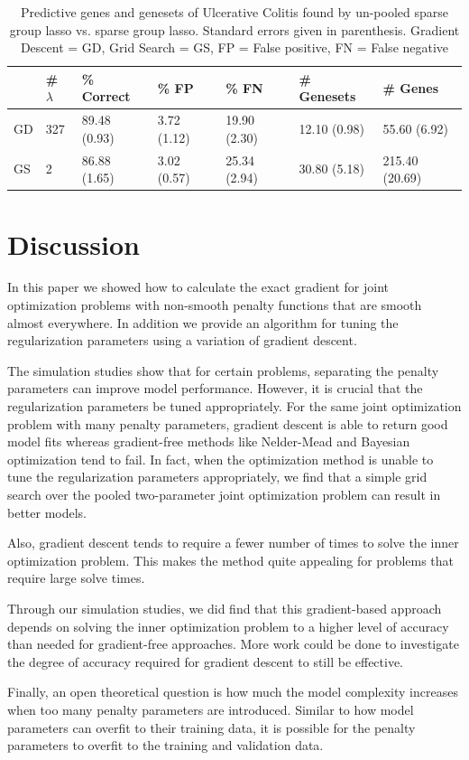 \documentclass[12pt]{article}
\begin{document}
\begin{table}
\caption{\label{colitis} Predictive genes and genesets of Ulcerative Colitis found by un-pooled sparse group lasso vs. sparse group lasso. Standard errors given in parenthesis. Gradient Descent = GD, Grid Search = GS, FP = False positive, FN = False negative}
\centering
\begin{tabular}{| l |l |l | l | l | l | l | }
\hline
& \# $\lambda$ & \% Correct  & \% FP & \% FN & \# Genesets & \# Genes  \\
\hline
GD & 327 & 89.48 (0.93) & 3.72 (1.12) & 19.90 (2.30) &  12.10 (0.98) & 55.60 (6.92) \\
\hline
GS & 2 & 86.88 (1.65) & 3.02 (0.57) & 25.34 (2.94)  & 30.80 (5.18) & 215.40 (20.69) \\
\hline
\end{tabular}
\end{table}

\section{Discussion}
In this paper we showed how to calculate the exact gradient for joint optimization problems with non-smooth penalty functions that are smooth almost everywhere. In addition we provide an algorithm for tuning the regularization parameters using a variation of gradient descent. 

The simulation studies show that for certain problems, separating the penalty parameters can improve model performance. However, it is crucial that the regularization parameters be tuned appropriately. For the same joint optimization problem with many penalty parameters, gradient descent is able to return good model fits whereas gradient-free methods like Nelder-Mead and Bayesian optimization tend to fail. In fact, when the optimization method is unable to tune the regularization parameters appropriately, we find that a simple grid search over the pooled two-parameter joint optimization problem can result in better models.

Also, gradient descent tends to require a fewer number of times to solve the inner optimization problem. This makes the method quite appealing for problems that require large solve times. 

Through our simulation studies, we did find that this gradient-based approach depends on solving the inner optimization problem to a higher level of accuracy than needed for gradient-free approaches. More work could be done to investigate the degree of accuracy required for gradient descent to still be effective.

Finally, an open theoretical question is how much the model complexity increases when too many penalty parameters are introduced. Similar to how model parameters can overfit to their training data, it is possible for the penalty parameters to overfit to the training and validation data.

\bigskip



\end{document}
